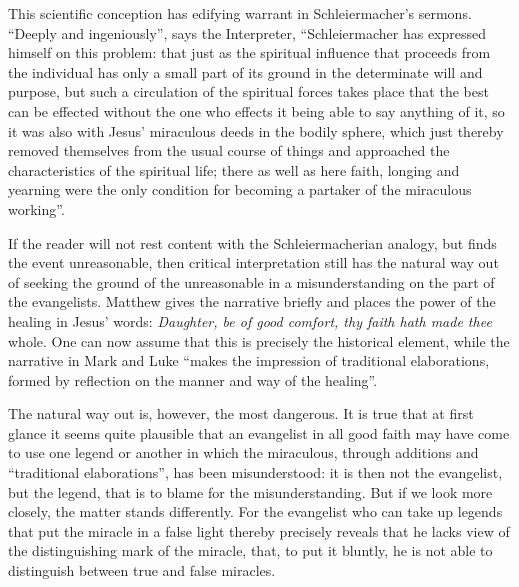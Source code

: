 \documentclass[12pt,a4paper,openany]{book}
\newcommand{\opage}[1]{\marginnote{\footnotesize\textit{[#1]}}}
\begin{document}
This scientific conception has edifying warrant
in Schleiermacher's sermons. ``Deeply and ingeniously'',
says the Interpreter, ``Schleiermacher has expressed himself on this
problem: that just as the spiritual influence that
\setcounter{footnote}{0}%
\opage{305}proceeds from the individual has only a small part of its
ground in the determinate will and purpose, but such a
circulation of the spiritual forces takes place that the
best can be effected without the one who effects it being able to
say anything of it, so it was also with Jesus' miraculous
deeds in the bodily sphere, which just thereby removed
themselves from the usual course of things and approached
the characteristics of the spiritual life; there as well as here
faith, longing and yearning were the only condition
for becoming a partaker of the miraculous working''.

If the reader will not rest content with the Schleiermacherian
analogy, but finds the event unreasonable,
then critical interpretation still has the natural
way out of seeking the ground of the unreasonable in a misunderstanding
on the part of the evangelists. Matthew gives the narrative
briefly and places the power of the healing in Jesus' words:
\emph{Daughter, be of good comfort, thy faith hath made thee}
whole. One can now assume that this is precisely the historical element,
while the narrative in Mark and Luke ``makes
the impression of traditional elaborations, formed by reflection
on the manner and way of the healing''.

The natural way out is, however, the most dangerous. It is true that
at first glance it seems quite plausible that an
evangelist in all good faith may have come to
use one legend or another in which the miraculous, through additions
and ``traditional elaborations'', has been misunderstood:
it is then not the evangelist, but the legend, that
is to blame for the misunderstanding. But if we look more closely,
the matter stands differently. For the evangelist
who can take up legends that put the miracle in a false
light thereby precisely reveals that he lacks
\setcounter{footnote}{0}%
\opage{306}view of the distinguishing mark of the miracle, that, to put it bluntly, he is not
able to distinguish between true and false miracles.
\end{document}

